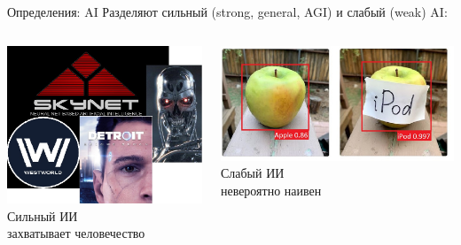 \documentclass[aspectratio=169, professionalfonts]{beamer}
\begin{document}
\begin{frame}{Определения: AI}
    Разделяют сильный (strong, general, AGI) и слабый (weak) AI:
    \begin{columns}
        \begin{column}{.35\linewidth}
            \centering
            \includegraphics[width=\linewidth]{figures/fig4-strong-ai.jpg}
            Сильный ИИ \\
            \footnotesize{захватывает человечество}
        \end{column}

        \begin{column}{.35\linewidth}
            \centering
            \includegraphics[width=\linewidth]{figures/fig5-weak-ai.jpg}
            Слабый ИИ \\
            \footnotesize{невероятно наивен}
        \end{column}
    \end{columns}
\end{frame}
\end{document}
